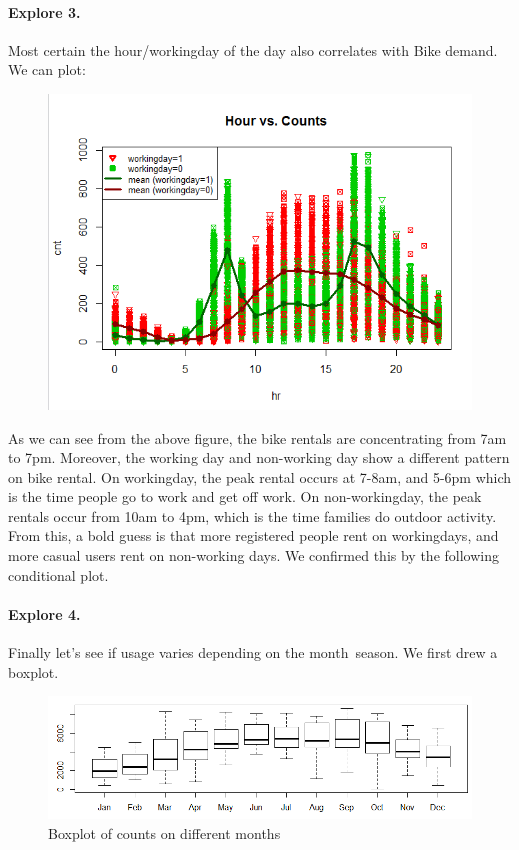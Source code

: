 \documentclass[12pt]{article}
\begin{document}
	\paragraph*{Explore 3.} Most certain the hour/workingday of the day also correlates with Bike demand. We can plot: 
	\begin{figure}[H]
		\centering
		\includegraphics[scale=.85]{figures/hr_cnt.png}
	\end{figure}
	
	As we can see from the above figure, the bike rentals are concentrating from 7am to 7pm. Moreover, the working day and non-working day show a different pattern on bike rental. On workingday, the peak rental occurs at 7-8am, and 5-6pm which is the time people go to work and get off work. On non-workingday, the peak rentals occur from 10am to 4pm, which is the time families do outdoor activity.  From this, a bold guess is that more registered people rent on workingdays, and more casual users rent on non-working days. We confirmed this by the following conditional plot.
	
	
	\paragraph*{Explore 4.} Finally let’s see if usage varies depending on the month\ season. We first drew a boxplot. 
	\begin{figure}[H]
		\centering
		\includegraphics[scale=.6]{figures/month_count.png}
		\caption{Boxplot of counts on different months}
	\end{figure}
	
\end{document}
